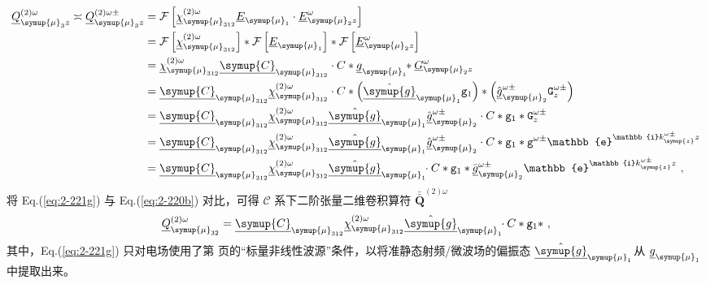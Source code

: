 \begin{subequations} \label{eq:2-221}
	\abovedisplayskip=13pt
	\belowdisplayskip=13pt
	\begin{align}
		{\underline{Q}}^{(2)\omega}_{{\symup{\mu}}_{3}z} \asymp {\underline{Q}}^{(2)\omega\pm}_{{\symup{\mu}}_{3}z} &= \mathcal F \left[ {\underline{\chi}}^{(2)\omega}_{ {\symup{\mu}}_{312}} \underline{E}_{{\symup{\mu}}_1} \cdot \underline{E}^\omega_{{\symup{\mu}}_2 z} \right] \label{eq:2-221a} \\ &= \mathcal F \left[ {\underline{\chi}}^{(2)\omega}_{ {\symup{\mu}}_{312}} \right] * \mathcal F \left[ \underline{E}_{{\symup{\mu}}_1} \right] * \mathcal F \left[ \underline{E}^{\omega}_{{\symup{\mu}}_2 z} \right]  \label{eq:2-221b} \\ &= {\underline{\chi}}^{(2)\omega}_{{\symup{\mu}}_{312}} {\underline{\symup{C}}}_{{\symup{\mu}}_{312}} \cdot C * \underline{g}_{{\symup{\mu}}_1} \!\! * \underline{G}^{\omega}_{{\symup{\mu}}_2 z} \label{eq:2-221c} \\ &= {\underline{\symup{C}}}_{{\symup{\mu}}_{312}} {\underline{\chi}}^{(2)\omega}_{{\symup{\mu}}_{312}} \cdot C * \left( \hat{\underline{\symup{g}}}_{{\symup{\mu}}_1} {\mathtt{g}}_1 \right) * \left( \hat{\underline{g}}^{\omega\pm}_{{\symup{\mu}}_2} {\mathtt{G}}^{\omega\pm}_{z} \right) \label{eq:2-221d} \\ &= {\underline{\symup{C}}}_{{\symup{\mu}}_{312}} {\underline{\chi}}^{(2)\omega}_{{\symup{\mu}}_{312}} \hat{\underline{\symup{g}}}_{{\symup{\mu}}_1} \hat{\underline{g}}^{\omega\pm}_{{\symup{\mu}}_2} \cdot C * {\mathtt{g}}_1 * {\mathtt{G}}^{\omega\pm}_{z} \label{eq:2-221e} \\ &= {\underline{\symup{C}}}_{{\symup{\mu}}_{312}} {\underline{\chi}}^{(2)\omega}_{{\symup{\mu}}_{312}} \hat{\underline{\symup{g}}}_{{\symup{\mu}}_1} \hat{\underline{g}}^{\omega\pm}_{{\symup{\mu}}_2} \cdot C * {\mathtt{g}}_1 * {\mathtt{g}}^{\omega\pm} \mathbb{e}^{\mathbb{i} k^{\omega\pm}_{\symup{z}} z} \label{eq:2-221f} \\ &= {\underline{\symup{C}}}_{{\symup{\mu}}_{312}} {\underline{\chi}}^{(2)\omega}_{{\symup{\mu}}_{312}} \hat{\underline{\symup{g}}}_{{\symup{\mu}}_1} \!\! \cdot C * {\mathtt{g}}_1 * \bar{\underline{g}}^{\omega\pm}_{{\symup{\mu}}_2} \mathbb{e}^{\mathbb{i} k^{\omega\pm}_{\symup{z}} z} \label{eq:2-221g}~,
	\end{align}
\end{subequations}
将 Eq.(\ref{eq:2-221g}) 与 Eq.(\ref{eq:2-220b}) 对比，可得 $\mathcal C$ 系下二阶张量二维卷积算符 ${\bar{\bar{\symbf Q}}^{(2)\omega}}$
\begin{equation} \label{eq:2-222}
	{\underline{Q}^{(2)\omega}_{{\symup{\mu}}_{32}}} = {\underline{\symup{C}}}_{{\symup{\mu}}_{312}} {\underline{\chi}}^{(2)\omega}_{{\symup{\mu}}_{312}} \hat{\underline{\symup{g}}}_{{\symup{\mu}}_1} \!\! \cdot C * {\mathtt{g}}_1 * ~,
\end{equation}
其中，Eq.(\ref{eq:2-221g}) 只对电场使用了第 \pageref{con:3} 页的“标量非线性波源”条件，以将准静态射频/微波场的偏振态 $\hat{\underline{\symup{g}}}_{{\symup{\mu}}_1} \!\!$ 从 $\underline{g}_{{\symup{\mu}}_1} \!\!$ 中提取出来。

